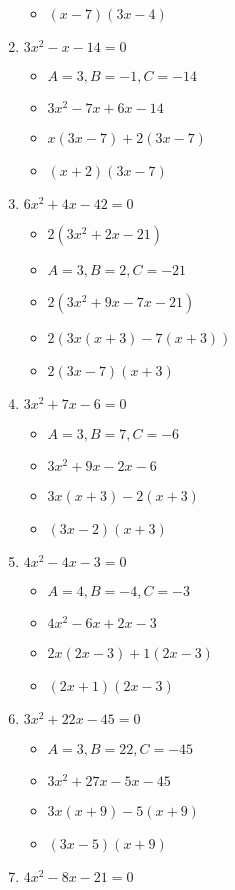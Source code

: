 \begin{enumerate}
\begin{itemize}
  \item $(x-7)(3x-4)$
  \end{itemize}
\item $3x^{2} - x - 14 = 0$
  \begin{itemize}
  \item $A=3, B=-1, C=-14$
  \item $3x^{2}-7x+6x-14$
  \item $x(3x-7)+2(3x-7)$
  \item $(x+2)(3x-7)$
  \end{itemize}
\item $6x^{2} + 4x - 42 = 0$
  \begin{itemize}
  \item $2(3x^{2}+2x-21)$
  \item $A=3, B=2, C=-21$
  \item $2(3x^{2}+9x-7x-21)$
  \item $2(3x(x+3)-7(x+3))$
  \item $2(3x-7)(x+3)$
  \end{itemize}
\item $3x^{2} + 7x - 6 = 0$
  \begin{itemize}
  \item $A=3, B=7, C=-6$
  \item $3x^{2}+9x-2x-6$
  \item $3x(x+3)-2(x+3)$
  \item $(3x-2)(x+3)$
  \end{itemize}
\item $4x^{2} - 4x - 3 = 0$
  \begin{itemize}
  \item $A=4, B=-4, C=-3$
  \item $4x^{2}-6x+2x-3$
  \item $2x(2x-3)+1(2x-3)$
  \item $(2x+1)(2x-3)$
  \end{itemize}
\item $3x^{2} + 22x - 45 = 0$
  \begin{itemize}
  \item $A=3, B=22, C=-45$
  \item $3x^{2}+27x-5x-45$
  \item $3x(x+9)-5(x+9)$
  \item $(3x-5)(x+9)$
  \end{itemize}
\item $4x^{2} - 8x - 21 = 0$
  \begin{itemize}

\end{itemize}
\end{enumerate}
